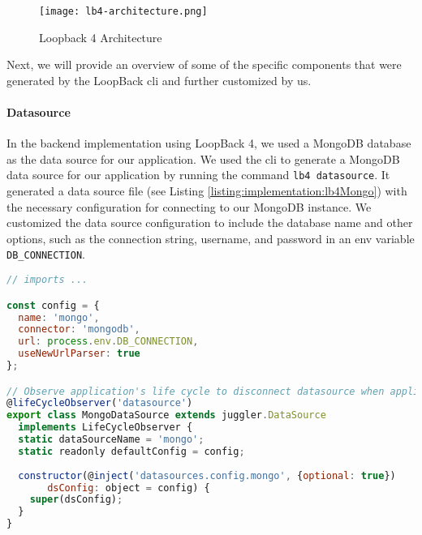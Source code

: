 \begin{figure}[ht]
    \centering
    \texttt{[image: lb4-architecture.png]}
    \caption[Loopback Architecture]{Loopback 4 Architecture\footnotemark[12]}
    \label{implementation:fig:loopbackarchitecture}
\end{figure}

Next, we will provide an overview of some of the specific components that were generated by the LoopBack \ac{cli} and further customized by us.
\paragraph{Datasource}
In the backend implementation using LoopBack 4, we used a MongoDB database as the data source for our application.
We used the \ac{cli} to generate a MongoDB data source for our application by running the command \texttt{lb4 datasource}. 
It generated a data source file (see Listing \ref{listing:implementation:lb4Mongo}) with the necessary configuration for connecting to our MongoDB instance.
We customized the data source configuration to include the database name and other options, such as the connection string, username, and password in an env variable \texttt{DB\_CONNECTION}.

\begin{lstlisting}[language=JavaScript, caption=The Typescript File for the MongoDB Datasource, label=listing:implementation:lb4Mongo]
// imports ...

const config = {
  name: 'mongo',
  connector: 'mongodb',
  url: process.env.DB_CONNECTION,
  useNewUrlParser: true
};

// Observe application's life cycle to disconnect datasource when application is stopped
@lifeCycleObserver('datasource')
export class MongoDataSource extends juggler.DataSource
  implements LifeCycleObserver {
  static dataSourceName = 'mongo';
  static readonly defaultConfig = config;
    
  constructor(@inject('datasources.config.mongo', {optional: true})
       dsConfig: object = config) {
    super(dsConfig);
  }
}
\end{lstlisting}

